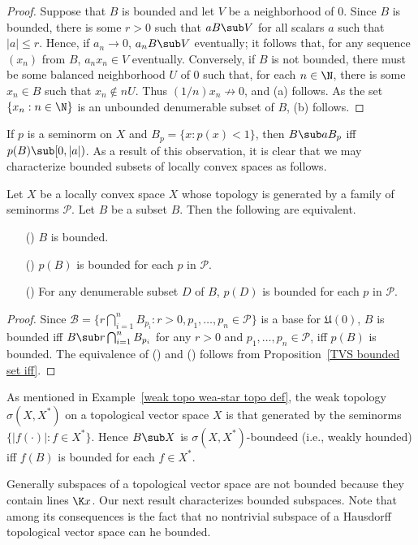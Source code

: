 \begin{proof}
Suppose that $B$ is bounded and let $V$ be a neighborhood of $0$. Since $B$ is bounded, there is some $r>0$ such that $aB\sub V$ for all scalars $a$ such that $|a|\leq r$. Hence, if $a_n\to 0$, $a_nB\sub V$ eventually; it follows that, for any sequence $(x_n)$ from $B$, $a_nx_n\in V$ eventually. Conversely, if $B$ is not bounded, there must be some balanced neighborhood $U$ of $0$ such that, for each $n\in\N$, there is some $x_n\in B$ such that $x_n\notin nU$. Thus $(1/n)x_n\not\to 0$, and (a) follows. As the set $\{x_n:n\in\N\}$ is an unbounded denumerable subset of $B$, (b) follows.
\end{proof}
If $p$ is a seminorm on $X$ and $B_p=\{x:p(x)<1\}$, then $B\sub aB_p$ iff $p(B)\sub[0,|a|)$. As a result of this observation, it is clear that we may characterize bounded subsets of locally convex spaces as follows.
\begin{proposition}\label{LCS bounded set iff}
Let $X$ be a locally convex space $X$ whose topology is generated by a family of seminorms $\mathscr{P}$. Let $B$ be a subset $B$. Then the following are equivalent.
\begin{itemize}
\item[(\rmnum{1})] $B$ is bounded.
\item[(\rmnum{2})] $p(B)$ is bounded for each $p$ in $\mathscr{P}$.
\item[(\rmnum{3})] For any denumerable subset $D$ of $B$, $p(D)$ is bounded for each $p$ in $\mathscr{P}$.
\end{itemize}
\end{proposition}
\begin{proof}
Since $\mathcal{B}=\{r\bigcap_{i=1}^{n}B_{p_i}:r>0,p_1,\dots,p_n\in\mathscr{P}\}$ is a base for $\mathfrak{U}(0)$, $B$ is bounded iff $B\sub r\bigcap_{i=1}^{n}B_{p_i}$ for any $r>0$ and $p_1,\dots,p_n\in\mathscr{P}$, iff $p(B)$ is bounded. The equivalence of () and () follows from Proposition~\ref{TVS bounded set iff}.
\end{proof}
As mentioned in Example~\ref{weak topo wea-star topo def}, the weak topology $\sigma(X,X^*)$ on a topological vector space $X$ is that generated by the seminorms $\{|f(\cdot)|:f\in X^*\}$. Hence $B\sub X$ is $\sigma(X,X^*)$-boundeed (i.e., weakly hounded) iff $f(B)$ is bounded for each $f\in X^*$.\par
Generally subspaces of a topological vector space are not bounded because they contain lines $\K x$. Our next result characterizes bounded subspaces. Note that among its consequences is the fact that no nontrivial subspace of a Hausdorff topological vector space can he bounded.
